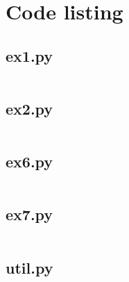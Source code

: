 \documentclass[10pt,a4paper,twoside,onecolumn]{article}
\begin{document}
\onecolumn
\appendixpage
\appendix

\section{Code listing}

\subsection{ex1.py}\label{app:ex1}
\inputminted{python}{../src/ex1.py}

\subsection{ex2.py}\label{app:ex2}
\inputminted{python}{../src/ex2.py}

\subsection{ex6.py}\label{app:ex6}
\inputminted{python}{../src/ex6.py}

\subsection{ex7.py}\label{app:ex7}
\inputminted{python}{../src/ex7.py}

\subsection{util.py}\label{app:util}
\inputminted{python}{../src/util.py}
\end{document}
